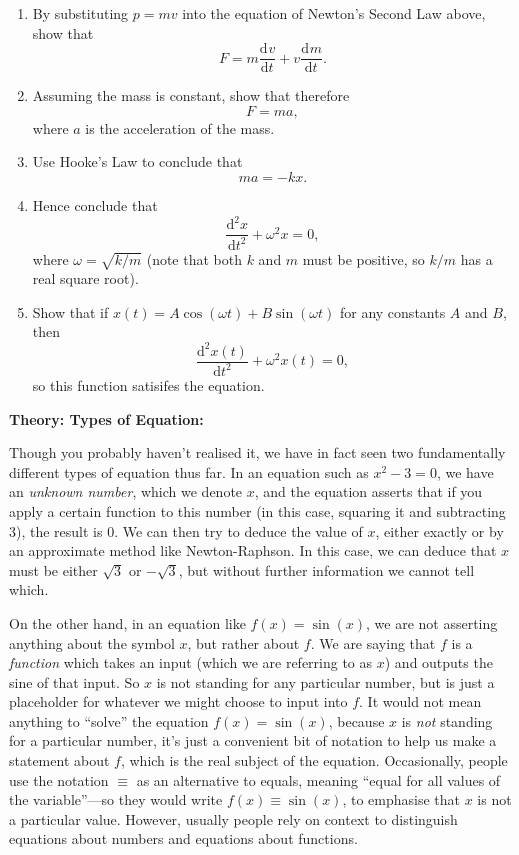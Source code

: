 \documentclass{article}
\newcommand{\deriv}[3][]{\frac{\mathrm{d}^{#1}#2}{\mathrm{d}#3^{#1}}}
\begin{document}
\begin{enumerate}
	\item By substituting $p=mv$ into the equation of Newton's Second Law above, show that
		\[F=m\deriv{v}{t}+v\deriv{m}{t}.\]
	\item Assuming the mass is constant, show that therefore
		\[F=ma,\]
		where $a$ is the acceleration of the mass.
	\item Use Hooke's Law to conclude that
		\[ma=-kx.\]
	\item Hence conclude that
		\[\deriv[2]{x}{t}+\omega^2 x=0,\]
		where $\omega=\sqrt{k/m}$ (note that both $k$ and $m$ must be positive, so $k/m$ has a real square root).
	\item Show that if $x(t)=A\cos(\omega t) + B\sin(\omega t)$ for any constants $A$ and $B$, then
		\[\deriv[2]{x(t)}{t}+\omega^2 x(t)=0,\]
		so this function satisifes the equation.
\end{enumerate}



\clearpage










\textbf{Theory: Types of Equation:}

\bigskip



Though you probably haven't realised it, we have in fact seen two fundamentally different types of equation thus far. In an equation such as $x^2-3=0$, we have an \textit{unknown number}, which we denote $x$, and the equation asserts that if you apply a certain function to this number (in this case, squaring it and subtracting 3), the result is 0. We can then try to deduce the value of $x$, either exactly or by an approximate method like Newton-Raphson. In this case, we can deduce that $x$ must be either $\sqrt{3}$ or $-\sqrt{3}$, but without further information we cannot tell which.

On the other hand, in an equation like $f(x)=\sin(x)$, we are not asserting anything about the symbol $x$, but rather about $f$. We are saying that $f$ is a \textit{function} which takes an input (which we are referring to as $x$) and outputs the sine of that input. So $x$ is not standing for any particular number, but is just a placeholder for whatever we might choose to input into $f$. It would not mean anything to ``solve'' the equation $f(x)=\sin(x)$, because $x$ is \textit{not} standing for a particular number, it's just a convenient bit of notation to help us make a statement about $f$, which is the real subject of the equation. Occasionally, people use the notation $\equiv$ as an alternative to equals, meaning ``equal for all values of the variable''---so they would write $f(x)\equiv \sin(x)$, to emphasise that $x$ is not a particular value. However, usually people rely on context to distinguish equations about numbers and equations about functions.
\end{document}
